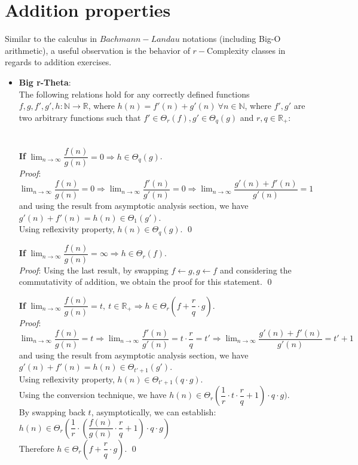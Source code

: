  
\section{Addition properties}
Similar to the calculus in $Bachmann-Landau$ notations (including Big-O arithmetic), a useful observation is the behavior of $r-$Complexity classes in regards to addition exercises. 



\begin{itemize}
  \item \textbf{Big r-Theta}:  \\
The following relations hold for any correctly defined functions $f, g, f', g', h:\mathbb{N}\longrightarrow\mathbb{R}$, where $ h(n) = f'(n) + g'(n)\  \forall n \in  \mathbb{N} $, where $f',g'$ are two arbitrary functions such that $ f' \in \Theta_{r}(f),  g' \in \Theta_{q}(g) $ and $r,q \in \mathbb{R}_{+}$:  
  \\ \\ \\
  \textbf{If} $ \lim_{n\to\infty} \dfrac{f(n)}{g(n)} = 0 \Rightarrow  h \in \Theta_{q}(g) $. \\

\textit{Proof}:
$ \lim_{n\to\infty} \dfrac{f(n)}{g(n)} = 0 \Rightarrow \lim_{n\to\infty} \dfrac{f'(n)}{g'(n)} = 0 \Rightarrow \lim_{n\to\infty} \dfrac{g'(n) + f'(n)}{g'(n)} = 1 $ and using the result from asymptotic analysis section, we have $ g'(n) + f'(n) = h(n) \in \Theta_{1}(g')$. \\ Using reflexivity property, $ h(n) \in \Theta_{q}(g)$.
\qed
\hfill\break

  \textbf{If} $ \lim_{n\to\infty} \dfrac{f(n)}{g(n)} = \infty \Rightarrow  h \in \Theta_{r}(f) $. \\
\textit{Proof}:
Using the last result, by swapping $f \leftarrow g, g \leftarrow f$ and considering the commutativity of addition, we obtain the proof for this statement.
\qed
\hfill\break


  \textbf{If} $ \lim_{n\to\infty} \dfrac{f(n)}{g(n)} = t, \ t \in \mathbb{R}_{+} \Rightarrow  h \in \Theta_{r} \left( f + \dfrac{r}{q} \cdot g \right) $. \\
\textit{Proof}:
$ \lim_{n\to\infty} \dfrac{f(n)}{g(n)} = t \Rightarrow \lim_{n\to\infty} \dfrac{f'(n)}{g'(n)} = t \cdot \dfrac{r}{q} = t' \Rightarrow \lim_{n\to\infty} \dfrac{g'(n) + f'(n)}{g'(n)} = t' + 1 $ and using the result from asymptotic analysis section, we have $ g'(n) + f'(n) = h(n) \in \Theta_{t' + 1}(g')$. \\ 
Using reflexivity property, $ h(n) \in \Theta_{t' + 1} (q \cdot g)$. \\
Using the conversion technique, we have $ h(n) \in \Theta_{r}( \dfrac{1}{r} \cdot t \cdot \dfrac{r}{q} + 1) \cdot q \cdot g)$. \\
By swapping back $t$, asymptotically, we can establish: $ h(n) \in \Theta_{r}( \dfrac{1}{r} \cdot ( \dfrac{f(n)}{g(n)} \cdot \dfrac{r}{q} + 1) \cdot q \cdot g)$ \\
Therefore $ h \in \Theta_{r} \left( f + \dfrac{r}{q} \cdot g \right) $.
\qed
\hfill\break



\end{itemize}
